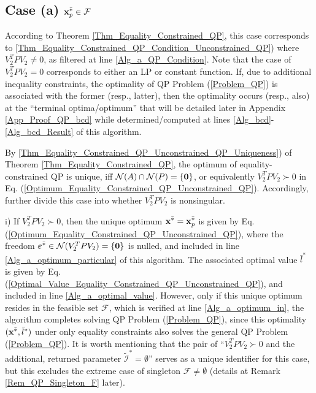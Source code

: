 \documentclass{imaman}
\newcommand{\bfx}{{\bf x}}
\newcommand{\bfvarepsilon}{{\boldsymbol \varepsilon}}
\newcommand{\bfzero}{{\bf 0}}
\newcommand{\calF}{{\mathcal F}}
\newcommand{\calI}{{\mathcal I}}
\newcommand{\calN}{{\mathcal N}}
\numberwithin{equation}{section}
\begin{document}
\subsection{Case (a) $\bfx_p^{\bar *}\in\calF$}
\label{App_Proof_QP_a}
According to Theorem \ref{Thm_Equality_Constrained_QP}, this case corresponds to \ref{Thm_Equality_Constrained_QP_Condition_Unconstrained_QP}) where $V_2^TPV_2\ne 0$, as filtered at line \ref{Alg_a_QP_Condition}. Note that the case of $V_2^TPV_2=0$ corresponds to either an LP or constant function. If, due to additional inequality constraints, the optimality of QP Problem (\ref{Problem_QP}) is associated with the former (resp., latter), then the optimality occurs (resp., also) at the ``terminal optima/optimum'' that will be detailed later in Appendix \ref{App_Proof_QP_bcd} while determined/computed at lines \ref{Alg_bcd}-\ref{Alg_bcd_Result} of this algorithm.

By \ref{Thm_Equality_Constrained_QP_Unconstrained_QP_Uniqueness}) of Theorem \ref{Thm_Equality_Constrained_QP}, the optimum of equality-constrained QP is unique, iff $\calN(A)\cap\calN(P)=\{\bfzero\}$, or equivalently $V_2^TPV_2\succ 0$ in Eq. (\ref{Optimum_Equality_Constrained_QP_Unconstrained_QP}). Accordingly, further divide this case into whether $V_2^TPV_2$ is nonsingular.\vspace{0.16cm}

\noindent i) If $V_2^TPV_2\succ 0$, then the unique optimum $\bfx^{\bar *}=\bfx_p^{\bar *}$ is given by Eq. (\ref{Optimum_Equality_Constrained_QP_Unconstrained_QP}), where the freedom $\bfvarepsilon^{\bar *}\in\calN(V_2^TPV_2)=\{\bfzero\}$ is nulled, and included in line \ref{Alg_a_optimum_particular} of this algorithm. The associated optimal value $\bar l^*$ is given by Eq. (\ref{Optimal_Value_Equality_Constrained_QP_Unconstrained_QP}), and included in line \ref{Alg_a_optimal_value}. However, only if this unique optimum resides in the feasible set $\calF$, which is verified at line \ref{Alg_a_optimum_in}, the algorithm completes solving QP Problem (\ref{Problem_QP}), since this optimality $(\bfx^{\bar *},\bar l^*)$ under only equality constraints also solves the general QP Problem (\ref{Problem_QP}). It is worth mentioning that the pair of ``$V_2^TPV_2\succ 0$ and the additional, returned parameter $\tilde\calI^*=\emptyset$'' serves as a unique identifier for this case, but this excludes the extreme case of singleton $\calF\ne\emptyset$ (details at Remark \ref{Rem_QP_Singleton_F} later).\vspace{0.16cm}
\end{document}
